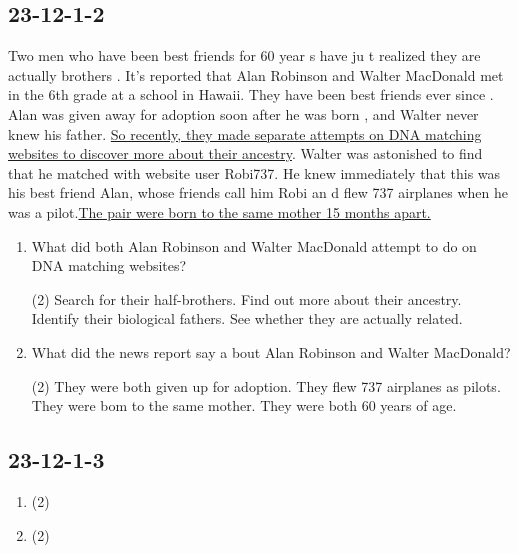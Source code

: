 \subsection{23-12-1-2}
\begin{margintable}\vspace{-2cm}\footnotesize
\end{margintable}

Two men who have been best friends for 60 year s have ju t realized they are actually brothers . It's reported
that Alan Robinson and Walter MacDonald met in the 6th grade at a school in Hawaii. They have been best friends ever since . Alan was given away for adoption soon after he was born , and Walter never knew his father. \uline{So recently, they made separate attempts on DNA matching websites to discover more about their ancestry}. Walter was astonished to find that he matched with website user Robi737. He knew immediately that this was his best friend Alan, whose friends call him Robi an d flew 737 airplanes when he was a pilot.\uline{The pair were born to the same mother 15 months apart.}


\begin{fullpage}
	\begin{enumerate}
		\item What did both Alan Robinson and Walter MacDonald attempt to do on DNA matching websites?
		\begin{tasks}(2)
			\task Search for their half-brothers. \task Find out more about their ancestry.
			\task Identify their biological fathers. \task See whether they are actually related.
		\end{tasks}
		\item What did the news report say a bout Alan Robinson and Walter MacDonald?
		\begin{tasks}(2)
			\task They were both given up for adoption.  \task They flew 737 airplanes as pilots.
			\task They were bom to the same mother. \task They were both 60 years of age.
		\end{tasks}
	\end{enumerate}
\end{fullpage}

\subsection{23-12-1-3}
\begin{margintable}\vspace{-2cm}\footnotesize
	\includemedia[
	addresource=sound/cet4/report/cet4-23-12-1-report3.mp3]{\faBullhorn}{VPlayer.swf}
\end{margintable}




\begin{fullpage}
	\begin{enumerate}
		\item 
		\begin{tasks}(2)
			\task  \task 
			\task \task 
		\end{tasks}
		\item 
		\begin{tasks}(2)
			\task  \task 
			\task \task 
		\end{tasks}
	\end{enumerate}
\end{fullpage}